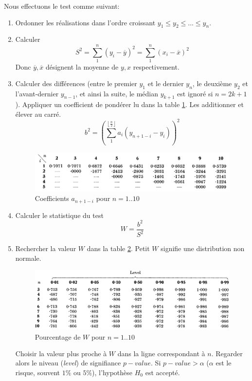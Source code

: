 \documentclass[12pt,a4paper]{article}
\begin{document}
Nous effectuons le test comme suivant:
\begin{enumerate}
\item Ordonner les réalisations dans l'ordre croissant $y_1 \leq y_2 \leq ... \leq y_n$.
\item Calculer \[{S^2} = \sum\limits_1^n {{{\left( {{y_i} - \overline y } \right)}^2}}  = \sum\limits_1^n {{{\left( {{x_i} - \overline x } \right)}^2}} \]
Donc $\overline y, \overline x$ désignent la moyenne de $y, x$ respectivement.
\item Calculer des différences (entre le premier $y_1$ et le dernier $y_n$, le deuxième $y_2$ et l'avant-dernier $y_{n-1}$, et ainsi la suite, le médian $y_{k+1}$ est ignoré si $n=2k+1$). Appliquer un coefficient de pondérer lu dans la table \ref{ShapiroWilkTablePonderer}. Les additionner et élever au carré.
\[{b^2} = {\left( {\sum\limits_1^{\left\lfloor {\frac{n}{2}} \right\rfloor } {{a_i}\left( {{y_{n + 1 - i}} - {y_i}} \right)} } \right)^2}\]
\begin{figure}[!h]
\centering
\includegraphics[width=\textwidth]{images/ShapiroWilk_N_1_10.png}
\caption{Coefficients $a_{n+1-i}$ pour $n=1..10$}
\label{ShapiroWilkTablePonderer}
\end{figure}
\item Calculer le statistique du test \[W = \frac{{{b^2}}}{{{S^2}}}\]
\item Rechercher la valeur $W$ dans la table \ref{ShapiroWilkTablePourcentage}. Petit $W$ signifie une distribution non normale.
\begin{figure}[!h]
\centering
\includegraphics[width=\textwidth]{images/ShapiroWilk_Percentage.png}
\caption{Pourcentage de $W$ pour $n=1..10$}
\label{ShapiroWilkTablePourcentage}
\end{figure}
Choisir la valeur plus proche à $W$ dans la ligne correspondant à $n$. Regarder alors le niveau (\emph{level}) de signifiance $p-value$. Si $p-value > \alpha$ ($\alpha$ est le risque, souvent $1\%$ ou $5\%$), l'hypothèse $H_0$ est accepté.
\end{enumerate}
\end{document}
